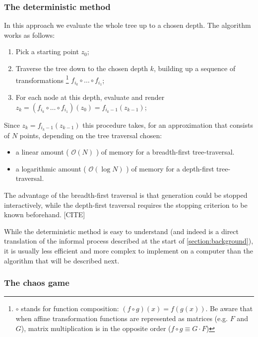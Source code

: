\documentclass[11pt]{article}
\begin{document}


\subsubsection{The deterministic method}
\label{sec:org54a6c9c}

In this approach we evaluate the whole tree up to a chosen depth. The algorithm works as follows:

\begin{enumerate}
\item Pick a starting point \(z_0\);
\item Traverse the tree down to the chosen depth \(k\), building up a sequence of transformations \footnote{\(\circ\) stands for function composition: \((f \circ g)(x) = f(g(x))\). 
Be aware that when affine transformation functions are represented as matrices (e.g. \(F\) and \(G\)), matrix multiplication is in the opposite order (\(f \circ g \equiv G \cdot F\))}
\(f_{i_k} \circ \ldots \circ f_{i_1}\);
\item For each node at this depth, evaluate and render \(z_k = (f_{i_k} \circ \ldots \circ f_{i_1})(z_0) = f_{i_k-1}(z_{k-1})\);
\end{enumerate}

Since \(z_{k} = f_{i_k-1}(z_{k-1})\) this procedure takes, for an approximation that consists of \(N\) points, depending on the tree traversal chosen:

\begin{itemize}
\item a linear amount ( \(\mathcal{O}(N)\) ) of memory  for a breadth-first tree-traversal.
\item a logarithmic amount ( \(\mathcal{O}(\log{N})\) ) of memory for a depth-first tree-traversal.
\end{itemize}

The advantage of the breadth-first traversal is that generation could be stopped interactively,
while the depth-first traversal requires the stopping criterion to be known beforehand. [CITE]

While the deterministic method is easy to understand (and indeed is a direct translation of the informal process described at the start of \autoref{section:background}),
it is usually less efficient and more complex to implement on a computer than the algorithm that will be described next.

\subsubsection{The chaos game}
\label{sec:orgcf7d05e}
\label{subsection:chaos_game}
\end{document}
